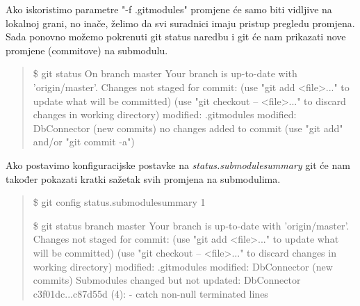 \documentclass {article}
\begin{document}
\begin{enumerate}
\begin{enumerate}
Ako iskoristimo parametre "-f .gitmodules" promjene će samo biti vidljive na lokalnoj grani, no inače, želimo da svi suradnici imaju pristup pregledu promjena.
\newline Sada ponovno možemo pokrenuti git status naredbu i git će nam prikazati nove promjene (commitove) na submodulu.
\newline 
    \begin{quote}
        \$ git status
\newline On branch master
\newline Your branch is up-to-date with 'origin/master'.
\newline 
\newline Changes not staged for commit:
\newline   (use "git add <file>..." to update what will be committed)
\newline   (use "git checkout -- <file>..." to discard changes in working directory)
\newline 
 \newline  modified:   .gitmodules
\newline   modified:   DbConnector (new commits)
\newline  
\newline no changes added to commit (use "git add" and/or "git commit -a")
\newline
    \end{quote}
Ako postavimo konfiguracijske postavke na \emph{status.submodulesummary} git će nam također pokazati kratki sažetak svih promjena na submodulima.
\newline
    \begin{quote}
        \$ git config status.submodulesummary 1

\$ git status
\newline branch master
\newline Your branch is up-to-date with 'origin/master'.
\newline
\newline Changes not staged for commit:
 \newline (use "git add <file>..." to update what will be committed)
\newline  (use "git checkout -- <file>..." to discard changes in working directory)
\newline
\newline	modified:   .gitmodules
\newline	modified:   DbConnector (new commits)
\newline
\newline Submodules changed but not updated:
\newline
\newline* DbConnector c3f01dc...c87d55d (4):
  \newline- catch non-null terminated lines
  \newline
    \end{quote}
   

\end{enumerate}
\end{enumerate}
\end{document}

